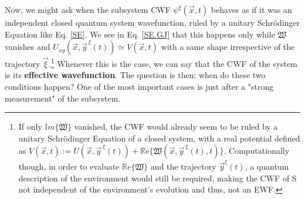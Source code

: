 \documentclass[11pt, a4paper]{article} %
\newcommand{\R}{\mathbb{R}} %
\begin{document}
Now, we might ask when the subsystem CWF $\psi^\xi(\vec{x},t)$ behaves as if it was an independent closed quantum system wavefunction, ruled by a unitary Schrödinger Equation like Eq. \eqref{SE}. We see in Eq. \eqref{SE.GJ} that this happens only while $\mathfrak{W}$ vanishes and $U_{xy}(\vec{x},\vec{y}^{\,\xi}(t))\simeq V(\vec{x},t)$ with a same shape irrespective of the trajectory $\vec{\xi}$.\footnote{ If only $\mathbb{I}m\{\mathfrak{W}\}$ vanished, the CWF would already seem to be ruled by a unitary Schrödinger Equation of a closed system, with a real potential defined as $V(\vec{x},t):=U(\vec{x},\vec{y}^{\:\xi}(t))+\R e\{\mathfrak{W}(\vec{x},\vec{y}^{\:\xi}(t),t)\}$. Computationally though, in order to evaluate $\R e\{\mathfrak{W}\}$ and the trajectory $\vec{y}^\xi(t)$, a quantum description of the environment would still be required, making the CWF of S not independent of the environment's evolution and thus, not an EWF. } Whenever this is the case, we can say that the CWF of the system is its {\bf effective wavefunction}. The question is then: when do these two conditions happen? One of the most important cases is just after a "strong measurement" of the subsystem. 
\end{document}
